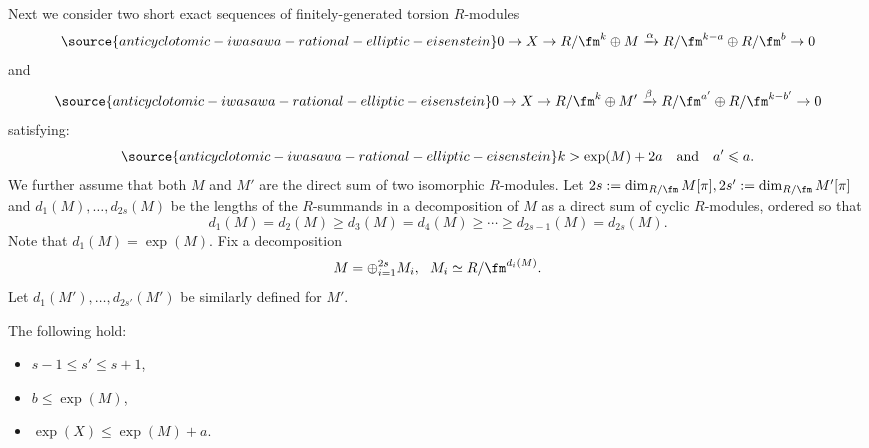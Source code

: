 Next we consider two short exact sequences of finitely-generated torsion $R$-modules
\begin{equation}\label{ses1}
\source{anticyclotomic-iwasawa-rational-elliptic-eisenstein}
0 \rightarrow X \rightarrow R/\fm^k \oplus M \xrightarrow{\alpha} R/\fm^{k-a} \oplus R/\fm^{b} \rightarrow 0
\end{equation}
and
\begin{equation}\label{ses2}
\source{anticyclotomic-iwasawa-rational-elliptic-eisenstein}
0 \rightarrow X \rightarrow R/\fm^k \oplus M'\xrightarrow{\beta} R/\fm^{a'} \oplus R/\fm^{k-b'} \rightarrow 0
\end{equation}
satisfying:
\begin{equation}\label{ses-hyp}
\source{anticyclotomic-iwasawa-rational-elliptic-eisenstein}
k>\exp(M)+2a \ \ \ \text{and} \ \ \ a'\leqslant a.
\end{equation}
We further assume that both $M$ and $M'$ are the direct sum of two isomorphic $R$-modules. Let $2s:= \dim_{R/\fm} M[\pi], 2s':= \dim_{R/\fm} M'[\pi]$ and $d_1(M),\dots,d_{2s}(M)$ be the lengths of the $R$-summands in a decomposition of $M$ as a direct sum of cyclic $R$-modules,
ordered so that
$$
d_1(M) = d_2(M) \geqslant d_3(M)=d_4(M) \geqslant \cdots \geqslant d_{2s-1}(M) = d_{2s}(M).
$$
Note that $d_1(M) = \exp(M)$.
Fix a decomposition
$$
M = \oplus_{i=1}^{2s} M_i, \ \ M_i \simeq R/\fm^{d_i(M)}.
$$
Let $d_1(M'),\dots,d_{2s'}(M')$ be similarly defined for $M'$.
\begin{lemma}
\notready\label{lem:key} The following hold:
\begin{itemize}
\item[(i)]  $s-1\leqslant s'\leqslant s+1$,
\item[(ii)] $b\leqslant \exp(M)$,
\item[(iii)] $\exp(X) \leqslant \exp(M)+a$.
\end{itemize}
\end{lemma}

